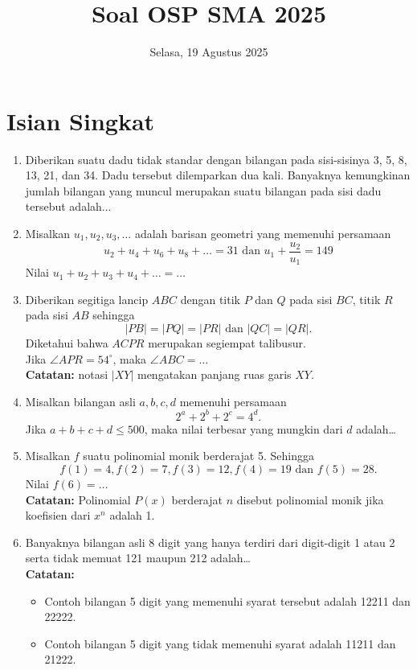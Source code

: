 \documentclass[12pt]{scrartcl}
\title{Soal OSP SMA 2025}
\date{Selasa, 19 Agustus 2025}
\begin{document}
\maketitle

\renewcommand*\contentsname{Daftar Isi}
\tableofcontents

\newpage

\section{Isian Singkat}

\begin{enumerate}
    \item Diberikan suatu dadu tidak standar dengan bilangan pada sisi-sisinya 3, 5, 8, 13, 21, dan 34. Dadu tersebut dilemparkan dua kali. Banyaknya kemungkinan jumlah bilangan yang muncul merupakan suatu bilangan pada sisi dadu tersebut adalah...

    \item Misalkan $u_1, u_2, u_3, \dots$ adalah barisan geometri yang memenuhi persamaan 
    $$u_2 + u_4 + u_6 + u_8+\dots = 31 \text{ dan } u_1+\dfrac{u_2}{u_1} = 149$$
    Nilai $u_1 + u_2 + u_3 + u_4 + \dots = \dots$

    \item Diberikan segitiga lancip $ABC$ dengan titik $P$ dan $Q$ pada sisi $BC$, titik $R$ pada sisi $AB$ sehingga $$|PB|=|PQ|=|PR| \text{ dan } |QC|=|QR|.$$
    Diketahui bahwa $ACPR$ merupakan segiempat talibusur.\\
    Jika $\angle APR=54^\circ$, maka $\angle ABC = \dots$ \\
    \textbf{Catatan:} notasi $|XY|$ mengatakan panjang ruas garis $XY$.

    \item Misalkan bilangan asli $a, b, c, d$ memenuhi persamaan $$2^a+2^b+2^c=4^d.$$
    Jika $a+b+c+d \le 500$, maka nilai terbesar yang mungkin dari $d$ adalah\dots

    \newpage
    \item Misalkan $f$ suatu polinomial monik berderajat 5. Sehingga 
    $$f(1)=4, f(2)=7, f(3)=12, f(4)=19 \text{ dan }f(5)=28.$$
    Nilai $f(6)=\dots$ \\
    \textbf{Catatan:} Polinomial $P(x)$ berderajat $n$ disebut polinomial monik jika koefisien dari $x^n$ adalah 1.

    \item Banyaknya bilangan asli 8 digit yang hanya terdiri dari digit-digit 1 atau 2 serta tidak memuat 121 maupun 212 adalah\dots \\
    \textbf{Catatan:}
    \begin{itemize}
        \item Contoh bilangan 5 digit yang memenuhi syarat tersebut adalah 12211 dan 22222.
        \item Contoh bilangan 5 digit yang tidak memenuhi syarat adalah 11211 dan 21222.
    \end{itemize}


\end{enumerate}
\end{document}
